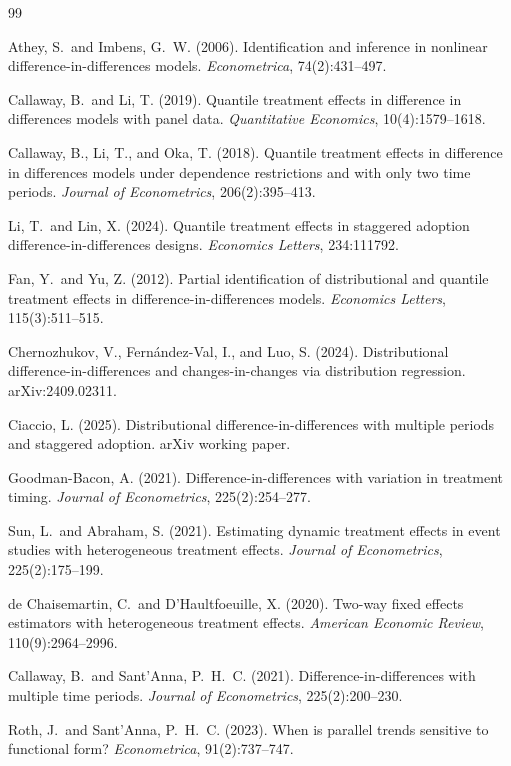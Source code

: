 \documentclass[11pt]{article}
\theoremstyle{definition}
\theoremstyle{plain}
\theoremstyle{remark}
\begin{document}
\begin{thebibliography}{99}

Athey, S.\ and Imbens, G.\ W. (2006).
Identification and inference in nonlinear difference-in-differences models.
\emph{Econometrica}, 74(2):431--497.

Callaway, B.\ and Li, T. (2019).
Quantile treatment effects in difference in differences models with panel data.
\emph{Quantitative Economics}, 10(4):1579--1618.

Callaway, B., Li, T., and Oka, T. (2018).
Quantile treatment effects in difference in differences models under dependence restrictions and with only two time periods.
\emph{Journal of Econometrics}, 206(2):395--413.

Li, T.\ and Lin, X. (2024).
Quantile treatment effects in staggered adoption difference-in-differences designs.
\emph{Economics Letters}, 234:111792.

Fan, Y.\ and Yu, Z. (2012).
Partial identification of distributional and quantile treatment effects in difference-in-differences models.
\emph{Economics Letters}, 115(3):511--515.

Chernozhukov, V., Fern\'andez-Val, I., and Luo, S. (2024).
Distributional difference-in-differences and changes-in-changes via distribution regression.
arXiv:2409.02311.

Ciaccio, L. (2025).
Distributional difference-in-differences with multiple periods and staggered adoption.
arXiv working paper.

Goodman-Bacon, A. (2021).
Difference-in-differences with variation in treatment timing.
\emph{Journal of Econometrics}, 225(2):254--277.

Sun, L.\ and Abraham, S. (2021).
Estimating dynamic treatment effects in event studies with heterogeneous treatment effects.
\emph{Journal of Econometrics}, 225(2):175--199.

de Chaisemartin, C.\ and D'Haultfoeuille, X. (2020).
Two-way fixed effects estimators with heterogeneous treatment effects.
\emph{American Economic Review}, 110(9):2964--2996.

Callaway, B.\ and Sant'Anna, P.\ H.\ C. (2021).
Difference-in-differences with multiple time periods.
\emph{Journal of Econometrics}, 225(2):200--230.

Roth, J.\ and Sant'Anna, P.\ H.\ C. (2023).
When is parallel trends sensitive to functional form?
\emph{Econometrica}, 91(2):737--747.

\end{thebibliography}
\end{document}

